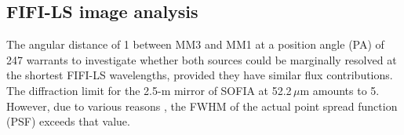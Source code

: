 \subsection{FIFI-LS image analysis}


The angular distance of 1 between MM3 and MM1 at a position angle (PA) of 247\degr{} warrants to investigate whether both sources could be marginally resolved at the shortest FIFI-LS wavelengths, provided they have similar flux contributions. The
diffraction limit for the 2.5-m mirror of SOFIA at 52.2\,$\mu$m amounts to 5. However, due to various reasons \citep{2017SPIE10401E..12G}, the FWHM of the actual point spread function (PSF) exceeds that value. 

